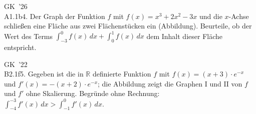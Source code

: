 \documentclass[11pt]{article}
\newcommand{\gzwei}[2]{\par\smallskip\noindent\sbox{\gbox}{#1}%
  \setlength{\gLinks}{\dimexpr\wd\gbox+6mm\relax}%
  \ifdim\gLinks>0.62\linewidth
    \usebox{\gbox}\par\smallskip\noindent\begin{minipage}{\linewidth}#2\end{minipage}%
  \else
    \begin{minipage}[t]{\gLinks}\vspace{0pt}\usebox{\gbox}\end{minipage}%
    \begin{minipage}[t]{\dimexpr\linewidth-\gLinks\relax}\vspace{0pt}\raggedright #2\end{minipage}%
  \fi\par}
\def\gkopfnach{}
\newcommand{\gkopfvor}[1]{\gdef\gkopfnach{#1}}
\newcommand{\karo}[1]{\par\smallskip\noindent\begin{tikzpicture}
  \clip (0,0) rectangle ({\linewidth-1mm},{#1*10mm});
  \draw[black!16,line width=0.3pt,step=5mm] (0,0) grid ({\linewidth},{#1*10mm});
  \end{tikzpicture}\par}
\begin{document}
\gkopfvor{\pfstufekopf{Vorzeichen des Integrals beurteilen}{\gpunkte[26 22]{\textcolor{black!80}{$\bullet$}\,\textcolor{black!25}{$\circ$}\,\textcolor{black!25}{$\circ$}\,\textcolor{black!25}{$\circ$}\,\textcolor{black!80}{$\bullet$}}}\special{pdf:dest (stufe-vorzeichen-des-integrals-beurteilen) [@thispage /XYZ @xpos @ypos null]}}
\begin{pfaufg}{GK~’26\\A1.1b}{4.}{\pfohnetr}
Der Graph der Funktion $f$ mit $f(x) = x^3 + 2x^2 - 3x$ und die $x$-Achse schließen eine Fläche aus zwei Flächenstücken ein (Abbildung). Beurteile, ob der Wert des Terms $\int_{-3}^{0} f(x)\,dx + \int_{0}^{1} f(x)\,dx$ dem Inhalt dieser Fläche entspricht.
\gzwei{\begin{abiksys}[xmin=-3.5,xmax=1.5,ymin=-2,ymax=7,le=0.4]\funktion[1.3]{\x^3+2*\x^2-3*\x}{G_f}\end{abiksys}}{\karo{4}}
\end{pfaufg}
\begin{pfaufg}{GK~’22\\B2.1f}{5.}{}
Gegeben ist die in $\mathbb{R}$ definierte Funktion $f$ mit $f(x) = (x + 3) \cdot e^{-x}$ und $f'(x) = -(x + 2) \cdot e^{-x}$; die Abbildung zeigt die Graphen I und II von $f$ und $f'$ ohne Skalierung. Begründe ohne Rechnung: $\int_{-4}^{-3} f'(x)\,dx > \int_{-1}^{0} f'(x)\,dx$.
\gzwei{\begin{abiksys}[xmin=-4.5,xmax=5,ymin=-3,ymax=9,le=0.4,yle=0.2,ohnezahlen,ohnegitter]\funktion[-1.2]{(\x+3)*exp(-\x)}{\mathrm{I}}\funktion[1.8]{-(\x+2)*exp(-\x)}{\mathrm{II}}\end{abiksys}}{\karo{4}}
\end{pfaufg}
\end{document}
